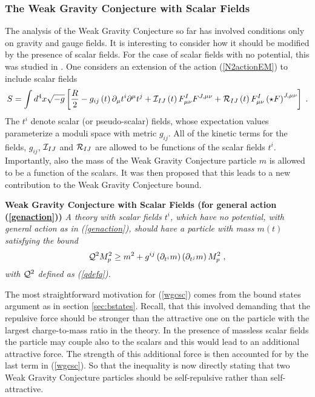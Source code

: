 \documentclass[11pt,a4paper]{article}
\numberwithin{equation}{section}
\numberwithin{table}{section}\setlength{\multlinegap}{25pt}
\newcommand{\be}{\begin{equation}}
\newcommand{\ee}{\end{equation}}
\begin{document}
\subsubsection{The Weak Gravity Conjecture with Scalar Fields}
\label{sec:wgcsca}

The analysis of the Weak Gravity Conjecture so far has involved conditions only on gravity and gauge fields. It is interesting to consider how it should be modified by the presence of scalar fields. For the case of scalar fields with no potential, this was studied in \cite{Palti:2017elp}. One considers an extension of the action (\ref{N2actionEM}) to include scalar fields
\be
S = \int d^4x \sqrt{-g} \left[ \frac{R}{2} - g_{ij}\left(t\right)\partial_{\mu} t^i \partial^{\mu} t^{j} + {\cal I}_{IJ}\left(t\right)F_{\mu\nu}^{I} F^{J,\mu\nu} +  {\cal R}_{IJ}\left(t\right) F_{\mu\nu}^{I} \left(\star F\right)^{J,\mu\nu} \right]\;.  \label{genaction}
\ee
The $t^i$ denote scalar (or pseudo-scalar) fields, whose expectation values parameterize a moduli space with metric $g_{ij}$. All of the kinetic terms for the fields, $g_{ij}$, $ {\cal I}_{IJ}$ and $ {\cal R}_{IJ}$ are allowed to be functions of the scalar fields $t^i$. Importantly, also the mass of the Weak Gravity Conjecture particle $m$ is allowed to be a function of the scalars. It was then proposed that this leads to a new contribution to the Weak Gravity Conjecture bound.

\begin{tcolorbox}
{\bf Weak Gravity Conjecture with Scalar Fields (for general action (\ref{genaction}))} \;\cite{Palti:2017elp}
{\it 
\newline
\newline
A theory with scalar fields $t^i$, which have no potential, with general action as in (\ref{genaction}), should have a particle with mass $m\left(t\right)$ satisfying the bound
\be
\label{wgcsc}
{\cal Q}^2 M_p^2 \geq m^2 + g^{ij} \left( \partial_{t^i} m \right) \left( \partial_{t^j} m \right) M_p^2\;,
\ee 
with ${\cal Q}^2$ defined as (\ref{qdefq}).
}
\end{tcolorbox}

The most straightforward motivation for (\ref{wgcsc}) comes from the bound states argument as in section \ref{sec:bstates}. Recall, that this involved demanding that the repulsive force should be stronger than the attractive one on the particle with the largest charge-to-mass ratio in the theory. In the presence of massless scalar fields the particle may couple also to the scalars and this would lead to an additional attractive force. The strength of this additional force is then accounted for by the last term in (\ref{wgcsc}). So that the inequality is now directly stating that two Weak Gravity Conjecture particles should be self-repulsive rather than self-attractive. 
\end{document}
